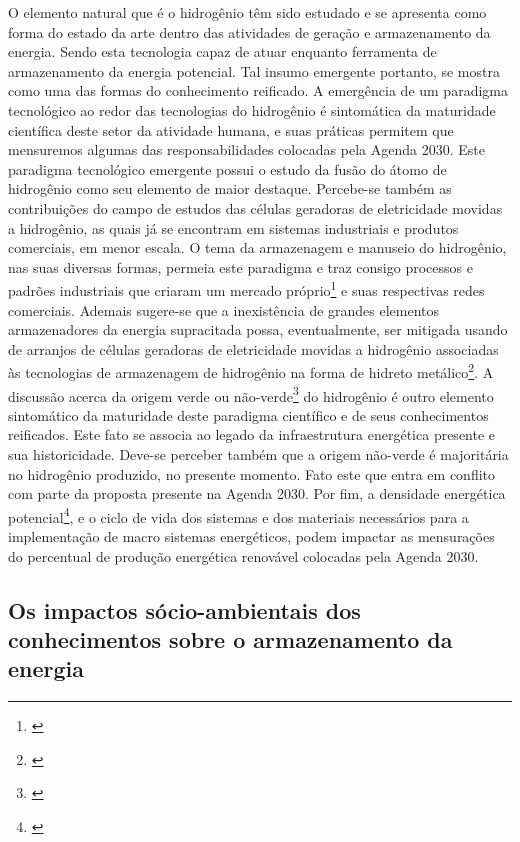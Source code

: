 \documentclass[
   article,       %
   12pt,          %
   oneside,       %
   a4paper,       %
   english,       %
   brazil,           %
   sumario=tradicional
   ]{abntex2}
\begin{document}
O elemento natural que é o hidrogênio têm sido estudado e se apresenta como forma do estado da arte dentro das atividades de geração e armazenamento da energia. Sendo esta tecnologia capaz de atuar enquanto ferramenta de armazenamento da energia potencial. Tal insumo emergente portanto, se mostra como uma das formas do conhecimento reificado. A emergência de um paradigma tecnológico ao redor das tecnologias do hidrogênio é sintomática da maturidade científica deste setor da atividade humana, e suas práticas permitem que mensuremos algumas das responsabilidades colocadas pela Agenda 2030. Este paradigma tecnológico emergente possui o estudo da fusão do átomo de hidrogênio como seu elemento de maior destaque. Percebe-se também as contribuições do campo de estudos das células geradoras de eletricidade movidas a hidrogênio, as quais já se encontram em sistemas industriais e produtos comerciais, em menor escala. O tema da armazenagem e manuseio do hidrogênio, nas suas diversas formas, permeia este paradigma e traz consigo processos e padrões industriais que criaram um mercado próprio\footnote{\cite{hydrogen_markets}} e suas respectivas redes comerciais. Ademais sugere-se que a inexistência de grandes elementos armazenadores da energia supracitada possa, eventualmente, ser mitigada usando de arranjos de células geradoras de eletricidade movidas a hidrogênio associadas às tecnologias de armazenagem de hidrogênio na forma de hidreto metálico\footnote{\cite{Comparison_hydrogen_hydrates}}. A discussão acerca da origem verde ou não-verde\footnote{\cite{Developments_hydrogen}} do hidrogênio é outro elemento sintomático da maturidade deste paradigma científico e de seus conhecimentos reificados. Este fato se associa ao legado da infraestrutura energética presente e sua historicidade. Deve-se perceber também que a origem não-verde é majoritária no hidrogênio produzido, no presente momento. Fato este que entra em conflito com parte da proposta presente na Agenda 2030. Por fim, a densidade energética potencial\footnote{\cite{B815553B}}, e o ciclo de vida dos sistemas e dos materiais necessários para a implementação de macro sistemas energéticos, podem impactar as mensurações do percentual de produção energética renovável colocadas pela Agenda 2030.


\subsection{Os impactos sócio-ambientais dos conhecimentos sobre o armazenamento da energia}
\end{document}
